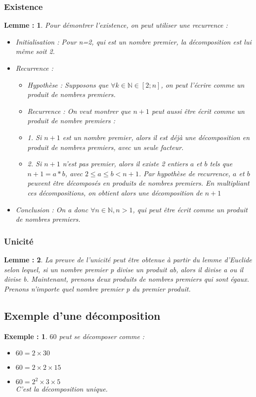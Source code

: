 \documentclass[titlepage]{article}
\newtheorem{exemple}{Exemple :}
\newtheorem{lemme}{Lemme :}
\begin{document}
\subsubsection{Existence}
\begin{lemme}
Pour démontrer l'existence, on peut utiliser une recurrence :
\begin{itemize}
\item Initialisation :
Pour n=2, qui est un nombre premier, la décomposition est lui même soit 2.
\item Recurrence :
\begin{itemize}
\item Hypothèse :
Supposons que $\forall k \in \mathbb{N} \in [2;n]$, on peut l'écrire comme un produit de nombres premiers.
\item Recurrence :
On veut montrer que $n+1$ peut aussi être écrit comme un produit de nombre premiers :
\item 1. Si $n+1$ est un nombre premier, alors il est déjà une décomposition en produit de nombres premiers, avec un seule facteur.
\item 2. Si $n+1$ n'est pas premier, alors il existe 2 entiers $a$ et $b$ tels que $n + 1 = a * b$, avec $2 \le a \le b < n+1$. Par hypothèse de recurrence, $a$ et $b$ peuvent être décomposés en produits de nombres premiers. En multipliant ces décompositions, on obtient alors une décomposition de $n+1$
\end{itemize}
\item Conclusion :
On a donc $\forall n \in \mathbb{N}, n > 1$, qui peut être écrit comme un produit de nombres premiers.
\end{itemize}
\end{lemme}

\subsubsection{Unicité}
\begin{lemme}
La preuve de l'unicité peut être obtenue à partir du lemme d'Euclide selon lequel, si un nombre premier p divise un produit ab, alors il divise a ou il divise b. Maintenant, prenons deux produits de nombres premiers qui sont égaux. Prenons n'importe quel nombre premier p du premier produit.
\end{lemme}

\subsection{Exemple d'une décomposition}
\begin{exemple}
$60$ peut se décomposer comme :
\begin{itemize}
\item $60 = 2 \times 30$
\item $60 = 2 \times 2 \times 15$
\item $60 = 2^2 \times 3 \times 5$
\\C'est la décomposition unique.
\end{itemize}

\end{exemple}
\end{document}
